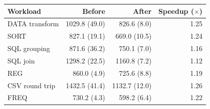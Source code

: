 \begin{tabular}{lrrr}
\toprule
Workload & Before & After & Speedup ($\times$) \\
\midrule
DATA transform & 1029.8 (49.0) & 826.6 (8.0) & 1.25 \\
SORT & 827.1 (19.1) & 669.0 (10.5) & 1.24 \\
SQL grouping & 871.6 (36.2) & 750.1 (7.0) & 1.16 \\
SQL join & 1298.2 (22.5) & 1160.8 (7.2) & 1.12 \\
REG & 860.0 (4.9) & 725.6 (8.8) & 1.19 \\
CSV round trip & 1432.5 (41.4) & 1132.7 (12.0) & 1.26 \\
FREQ & 730.2 (4.3) & 598.2 (6.4) & 1.22 \\
\bottomrule
\end{tabular}
